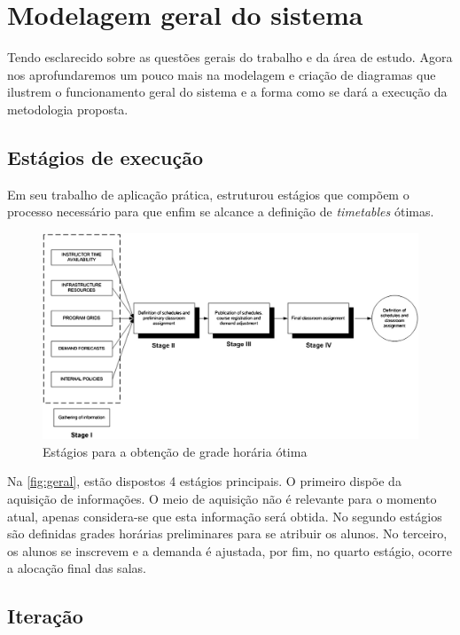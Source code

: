 \chapter{Modelagem geral do sistema} \label{chap:modelagem}

Tendo esclarecido sobre as questões gerais do trabalho e da área de estudo. Agora nos aprofundaremos um pouco mais na modelagem e criação de diagramas que ilustrem o funcionamento geral do sistema e a forma como se dará a execução da metodologia proposta.

\section{Estágios de execução}

Em seu trabalho de aplicação prática, \cite{miranda_udpskeduler_2012} estruturou estágios que compõem o processo necessário para que enfim se alcance a definição de \textit{timetables} ótimas.

\begin{figure}[htbp]\centering
  \caption{Estágios para a obtenção de grade horária ótima}
  \label{fig:geral}
  \includegraphics[width=\textwidth]{files/img/Arquitetura/Arquitetura-UDP}
\end{figure}

Na \autoref{fig:geral}, estão dispostos 4 estágios principais. O primeiro dispõe da aquisição de informações. O meio de aquisição não é relevante para o momento atual, apenas considera-se que esta informação será obtida. No segundo estágios são definidas grades horárias preliminares para se atribuir os alunos. No terceiro, os alunos se inscrevem e a demanda é ajustada, por fim, no quarto estágio, ocorre a alocação final das salas.

\section{Iteração}

